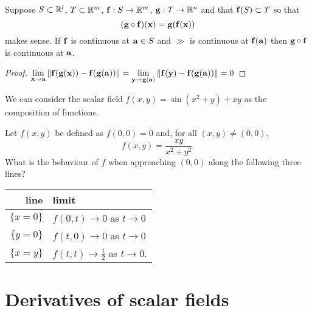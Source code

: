\begin{theorem}
    Suppose \(S \subset \bR^l\), \(T\subset \bR^m\), \(\ff:S \to \bR^m\), \(\gg : T \to \bR^n\) and that \(\ff(S) \subset T\) so that
    \[(\gg \circ \ff)(\xx) = \gg(\ff(\xx))\]
    makes sense.
    If \(\ff\) is continuous at \(\aa\in S\) and \(\gg\) is continuous at \(\ff(\aa)\) then \(\gg\circ \ff\) is continuous at \(\aa\).
\end{theorem}

\begin{proof}
    \(\displaystyle\lim_{\xx\to\aa}\norm{\ff(\gg(\xx))-\ff(\gg(\aa))}  =\displaystyle\lim_{\yy\to\gg(\aa)}\norm{\ff(\yy)-\ff(\gg(\aa))}  =0   \)
\end{proof}

\begin{example*}
    We can consider the scalar field \(f(x,y)= \sin(x^2 + y) + x y\) as the composition of functions.
\end{example*}



\begin{example*}
    Let \(f(x,y)\) be defined as \(f(0,0)=0\) and, for all \((x,y)\neq (0,0)\),
    \[
        f(x,y) =
        \frac{x y}{x^2 + y^2}.
    \]
    What is the behaviour of \(f\) when approaching \((0,0)\) along the following three lines?
    \begin{center}
        \begin{tabular}{r | l}
            line        & limit                                      \\
            \hline
            \(\{x=0\}\) & \(f(0,t) \to 0\) as \(t \to 0\)            \\
            \(\{y=0\}\) & \(f(t,0) \to 0\) as \(t \to 0\)            \\
            \(\{x=y\}\) & \(f(t,t) \to \frac{1}{2}\) as \(t \to 0\).
        \end{tabular}
    \end{center}
\end{example*}



\section{Derivatives of scalar fields}


